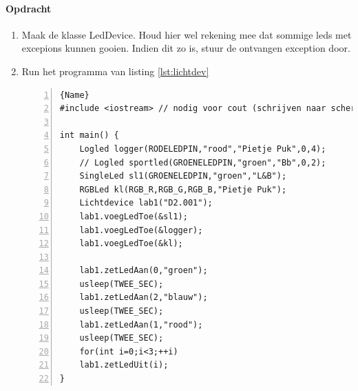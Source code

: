 \paragraph{Opdracht}

\begin{enumerate}
	\item Maak de klasse LedDevice. Houd hier wel rekening mee dat sommige leds met excepions kunnen gooien. Indien dit zo is, stuur de ontvangen exception door.

\newpage
	\item Run het programma van listing \ref{lst:lichtdev}	

\begin{lstlisting}[caption=Twee objecten van de klasse \texttt{LogLed}. ,frame=trbl,firstnumber=1,numbers=left,label={lst:lichtdev}]{Name}
#include <iostream> // nodig voor cout (schrijven naar scherm)

int main() {
	Logled logger(RODELEDPIN,"rood","Pietje Puk",0,4);
	// Logled sportled(GROENELEDPIN,"groen","Bb",0,2);
	SingleLed sl1(GROENELEDPIN,"groen","L&B");
	RGBLed kl(RGB_R,RGB_G,RGB_B,"Pietje Puk");
	Lichtdevice lab1("D2.001");
	lab1.voegLedToe(&sl1);
	lab1.voegLedToe(&logger);
	lab1.voegLedToe(&kl);
	
	lab1.zetLedAan(0,"groen");
	usleep(TWEE_SEC);
	lab1.zetLedAan(2,"blauw");
	usleep(TWEE_SEC);
	lab1.zetLedAan(1,"rood");
	usleep(TWEE_SEC);
	for(int i=0;i<3;++i)
	lab1.zetLedUit(i);
}
\end{lstlisting}
	

\end{enumerate}
